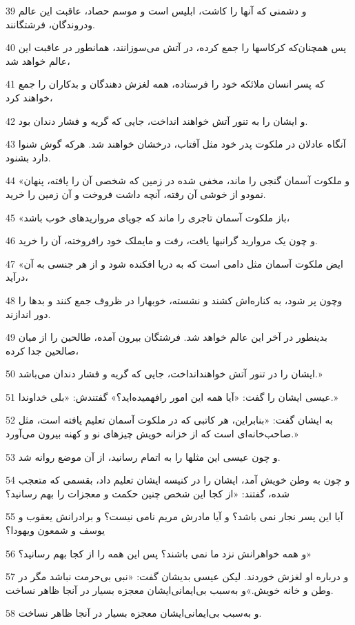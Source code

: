 \par 39 و دشمنی که آنها را کاشت، ابلیس است و موسم حصاد، عاقبت این عالم ودروندگان، فرشتگانند.
\par 40 پس همچنان‌که کرکاسها را جمع کرده، در آتش می‌سوزانند، همانطور در عاقبت این عالم خواهد شد،
\par 41 که پسر انسان ملائکه خود را فرستاده، همه لغزش دهندگان و بدکاران را جمع خواهند کرد،
\par 42 و ایشان را به تنور آتش خواهند انداخت، جایی که گریه و فشار دندان بود.
\par 43 آنگاه عادلان در ملکوت پدر خود مثل آفتاب، درخشان خواهند شد. هر‌که گوش شنوا دارد بشنود.
\par 44 «و ملکوت آسمان گنجی را ماند، مخفی شده در زمین که شخصی آن را یافته، پنهان نمودو از خوشی آن رفته، آنچه داشت فروخت و آن زمین را خرید.
\par 45 «باز ملکوت آسمان تاجری را ماند که جویای مرواریدهای خوب باشد،
\par 46 و چون یک مروارید گرانبها یافت، رفت و مایملک خود رافروخته، آن را خرید.
\par 47 «ایض ملکوت آسمان مثل دامی است که به دریا افکنده شود و از هر جنسی به آن درآید،
\par 48 وچون پر شود، به کناره‌اش کشند و نشسته، خوبهارا در ظروف جمع کنند و بدها را دور اندازند.
\par 49 بدینطور در آخر این عالم خواهد شد. فرشتگان بیرون آمده، طالحین را از میان صالحین جدا کرده،
\par 50 ایشان را در تنور آتش خواهندانداخت، جایی که گریه و فشار دندان می‌باشد.»
\par 51 عیسی ایشان را گفت: «آیا همه این امور رافهمیده‌اید؟» گفتندش: «بلی خداوندا.»
\par 52 به ایشان گفت: «بنابراین، هر کاتبی که در ملکوت آسمان تعلیم یافته است، مثل صاحب‌خانه‌ای است که از خزانه خویش چیزهای نو و کهنه بیرون می‌آورد.»
\par 53 و چون عیسی این مثلها را به اتمام رسانید، از آن موضع روانه شد.
\par 54 و چون به وطن خویش آمد، ایشان را در کنیسه ایشان تعلیم داد، بقسمی که متعجب شده، گفتند: «از کجا این شخص چنین حکمت و معجزات را بهم رسانید؟
\par 55 آیا این پسر نجار نمی باشد؟ و آیا مادرش مریم نامی نیست؟ و برادرانش یعقوب و یوسف و شمعون ویهودا؟
\par 56 و همه خواهرانش نزد ما نمی باشند؟ پس این همه را از کجا بهم رسانید؟»
\par 57 و درباره او لغزش خوردند. لیکن عیسی بدیشان گفت: «نبی بی‌حرمت نباشد مگر در وطن و خانه خویش.»و به‌سبب بی‌ایمانی‌ایشان معجزه بسیار در آنجا ظاهر نساخت.
\par 58 و به‌سبب بی‌ایمانی‌ایشان معجزه بسیار در آنجا ظاهر نساخت.

